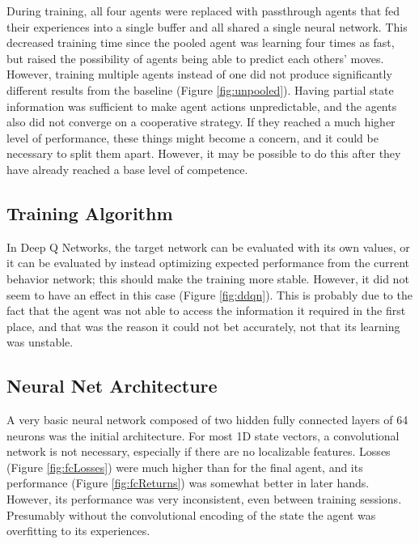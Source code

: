 \documentclass[10pt]{article} %
\begin{document}
During training, all four agents were replaced with passthrough agents that fed their experiences into a single buffer and all shared a single neural network. This decreased training time since the pooled agent was learning four times as fast, but raised the possibility of agents being able to predict each others' moves. However, training multiple agents instead of one did not produce significantly different results from the baseline (Figure \ref{fig:unpooled}). Having partial state information was sufficient to make agent actions unpredictable, and the agents also did not converge on a cooperative strategy. If they reached a much higher level of performance, these things might become a concern, and it could be necessary to split them apart. However, it may be possible to do this after they have already reached a base level of competence.


\subsection{Training Algorithm}

In Deep Q Networks, the target network can be evaluated with its own values, or it can be evaluated by instead optimizing expected performance from the current behavior network; this should make the training more stable. However, it did not seem to have an effect in this case (Figure \ref{fig:ddqn}). This is probably due to the fact that the agent was not able to access the information it required in the first place, and that was the reason it could not bet accurately, not that its learning was unstable.


\subsection{Neural Net Architecture}

A very basic neural network composed of two hidden fully connected layers of 64 neurons was the initial architecture. For most 1D state vectors, a convolutional network is not necessary, especially if there are no localizable features. Losses (Figure \ref{fig:fcLosses}) were much higher than for the final agent, and its performance (Figure \ref{fig:fcReturns}) was somewhat better in later hands. However, its performance was very inconsistent, even between training sessions. Presumably without the convolutional encoding of the state the agent was overfitting to its experiences.
\end{document}
